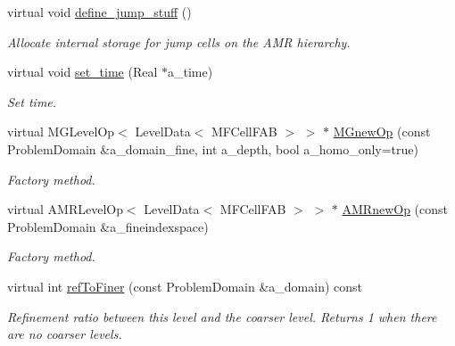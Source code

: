 \begin{DoxyCompactItemize}
virtual void \hyperlink{classmfconductivityopfactory_a069de7b518b2eb255dc6099822226e91}{define\+\_\+jump\+\_\+stuff} ()
\begin{DoxyCompactList}\small\item\em Allocate internal storage for jump cells on the A\+MR hierarchy. \end{DoxyCompactList}\item 
virtual void \hyperlink{classmfconductivityopfactory_a373054b97a9daecbbc22a2dea6e7111c}{set\+\_\+time} (Real $\ast$a\+\_\+time)
\begin{DoxyCompactList}\small\item\em Set time. \end{DoxyCompactList}\item 
virtual M\+G\+Level\+Op$<$ Level\+Data$<$ M\+F\+Cell\+F\+AB $>$ $>$ $\ast$ \hyperlink{classmfconductivityopfactory_a9c52e6f50576024a1083064adb845be0}{M\+Gnew\+Op} (const Problem\+Domain \&a\+\_\+domain\+\_\+fine, int a\+\_\+depth, bool a\+\_\+homo\+\_\+only=true)
\begin{DoxyCompactList}\small\item\em Factory method. \end{DoxyCompactList}\item 
virtual A\+M\+R\+Level\+Op$<$ Level\+Data$<$ M\+F\+Cell\+F\+AB $>$ $>$ $\ast$ \hyperlink{classmfconductivityopfactory_aa486bcfcfacd028f08e799f30523016a}{A\+M\+Rnew\+Op} (const Problem\+Domain \&a\+\_\+fineindexspace)
\begin{DoxyCompactList}\small\item\em Factory method. \end{DoxyCompactList}\item 
virtual int \hyperlink{classmfconductivityopfactory_aa09f8781d781d44193b1935d9a8de813}{ref\+To\+Finer} (const Problem\+Domain \&a\+\_\+domain) const 
\begin{DoxyCompactList}\small\item\em Refinement ratio between this level and the coarser level. Returns 1 when there are no coarser levels. \end{DoxyCompactList}\end{DoxyCompactItemize}
